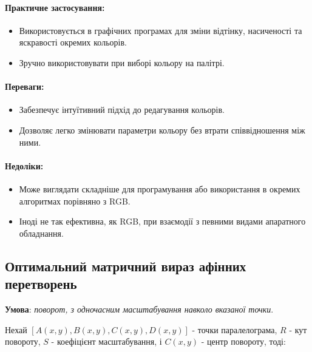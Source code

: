 \documentclass[oneside,14pt]{extarticle}
\begin{document}
\begin{normalsize}
	\paragraph{Практичне застосування:}
	\begin{itemize}
		\item Використовується в графічних програмах для зміни відтінку, насиченості та яскравості окремих кольорів.
		\item Зручно використовувати при виборі кольору на палітрі.
	\end{itemize}
	
	\paragraph{Переваги:}
	\begin{itemize}
		\item Забезпечує інтуїтивний підхід до редагування кольорів.
		\item Дозволяє легко змінювати параметри кольору без втрати співвідношення між ними.
	\end{itemize}
	
	\paragraph{Недоліки:}
	\begin{itemize}
		\item Може виглядати складніше для програмування або використання в окремих алгоритмах порівняно з RGB.
		\item Іноді не так ефективна, як RGB, при взаємодії з певними видами апаратного обладнання.
	\end{itemize}
	
	\subsection{Оптимальний матричний вираз афінних перетворень}
	\textbf{Умова}: \textit{поворот, з одночасним масштабування навколо вказаної точки}.
	
	Нехай $[A(x, y), B(x, y),C(x, y), D(x, y)]$ - точки паралелограма, $R$ - кут повороту, $S$ - коефіцієнт масштабування, і $C(x, y)$ - центр повороту, тоді:
	

\end{normalsize}
\end{document}
